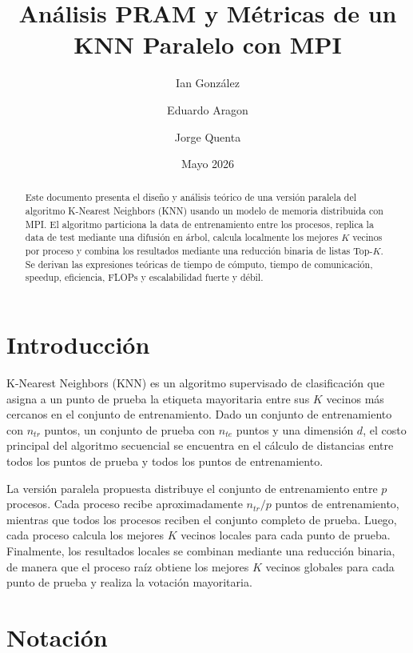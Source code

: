 \documentclass[11pt,a4paper]{article}
\title{Análisis PRAM y Métricas de un KNN Paralelo con MPI}
\author{
Ian González \and Eduardo Aragon \and Jorge Quenta
}
\date{Mayo 2026}
\begin{document}
\maketitle

\begin{abstract}
Este documento presenta el diseño y análisis teórico de una versión paralela del algoritmo
K-Nearest Neighbors (KNN) usando un modelo de memoria distribuida con MPI. El algoritmo
particiona la data de entrenamiento entre los procesos, replica la data de test mediante una
difusión en árbol, calcula localmente los mejores $K$ vecinos por proceso y combina los resultados
mediante una reducción binaria de listas Top-$K$. Se derivan las expresiones teóricas de tiempo
de cómputo, tiempo de comunicación, speedup, eficiencia, FLOPs y escalabilidad fuerte y débil.
\end{abstract}

\section{Introducción}

K-Nearest Neighbors (KNN) es un algoritmo supervisado de clasificación que asigna a un punto
de prueba la etiqueta mayoritaria entre sus $K$ vecinos más cercanos en el conjunto de
entrenamiento. Dado un conjunto de entrenamiento con $n_{tr}$ puntos, un conjunto de prueba
con $n_{te}$ puntos y una dimensión $d$, el costo principal del algoritmo secuencial se encuentra
en el cálculo de distancias entre todos los puntos de prueba y todos los puntos de entrenamiento.

La versión paralela propuesta distribuye el conjunto de entrenamiento entre $p$ procesos. Cada
proceso recibe aproximadamente $n_{tr}/p$ puntos de entrenamiento, mientras que todos los
procesos reciben el conjunto completo de prueba. Luego, cada proceso calcula los mejores
$K$ vecinos locales para cada punto de prueba. Finalmente, los resultados locales se combinan
mediante una reducción binaria, de manera que el proceso raíz obtiene los mejores $K$ vecinos
globales para cada punto de prueba y realiza la votación mayoritaria.

\section{Notación}
\end{document}

